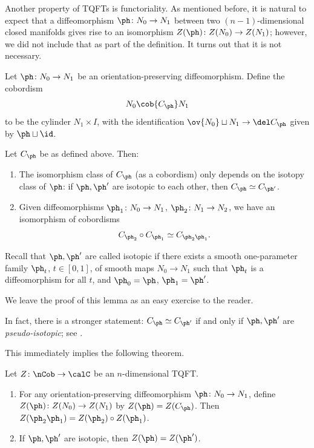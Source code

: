 Another property of TQFTs is functoriality. As mentioned before, it is
natural to expect that a diffeomorphism $\ph \colon N_0\to N_1$ between two
$(n-1)$-dimensional closed manifolds gives rise to an isomorphism
$Z(\ph)\colon Z(N_0)\to Z(N_1)$; however, we did not include that as part of
the definition. It turns out that it is not necessary.

Let $\ph \colon N_0\to N_1$ be an orientation-preserving diffeomorphism.
Define the cobordism
\begin{equation}\label{e:Cph}
  N_0\cob{C_\ph} N_1
\end{equation}
to be the cylinder $N_1\times I$, with the identification $\ov{N_0}\sqcup N_1
\to \del C_\ph$ given by $\ph\sqcup \id$.

\begin{lemma}\label{l:tqft-isotopy}
  Let $C_\ph$ be as defined above. Then:
  \begin{enumerate}
    \item The isomorphism class of $C_\ph$ \textup{(}as a cobordism\textup{)}
    only depends on the
    isotopy class of $\ph$: if $\ph, \ph'$ are isotopic to each other, then
      $C_\ph\simeq C_{\ph'}$.
    \item Given diffeomorphisms $\ph_1\colon N_0\to N_1$, $\ph_2\colon N_1\to
      N_2$, we have an isomorphism of cobordisms
      $$
        C_{\ph_2}\circ C_{\ph_1}\simeq C_{\ph_2 \ph_1}.
      $$
  \end{enumerate}
\end{lemma}
Recall that $\ph, \ph'$ are called isotopic if there exists a smooth
one-parameter family $\ph_t$, $t\in[0,1]$, of smooth maps $N_0\to N_1$ such that
$\ph_t$ is a diffeomorphism for all $t$, and $\ph_0=\ph$, $\ph_1=\ph'$.

We leave the proof of this lemma as an easy exercise to the reader.

\begin{remark}\label{r:pseudo-isotopy}
  In fact, there is a stronger statement: $C_\ph\simeq C_{\ph'}$ if and only if
  $\ph, \ph'$ are \emph{pseudo-isotopic}; see
  \cite[Theorem 1.9]{milnor-h-cobordism}.
\end{remark}




This immediately implies  the following theorem.
\begin{theorem}\label{t:tqft-functoriality}
  Let $Z\colon \nCob\to \calC$ be an $n$-dimensional TQFT.
  \begin{enumerate}
    \item For any orientation-preserving diffeomorphism $\ph\colon N_0\to N_1$,
      define $Z(\ph)\colon Z(N_0)\to Z(N_1)$ by $Z(\ph)=Z(C_\ph)$. Then
      $Z(\ph_2\ph_1)= Z(\ph_2)\circ Z(\ph_1)$.
    \item If $\ph,\ph'$ are isotopic, then $Z(\ph)=Z(\ph')$.
  \end{enumerate}
\end{theorem}

